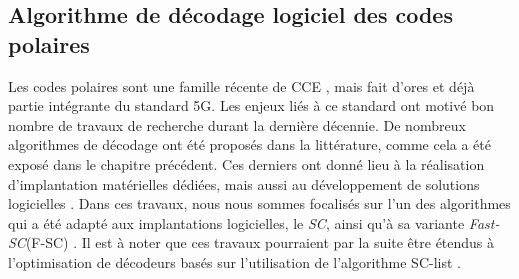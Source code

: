 \documentclass[../main.tex]{subfiles}
\begin{document}
\subsection{Algorithme de décodage logiciel des codes polaires}
%
%
%
%

Les codes polaires sont une famille récente de CCE \cite{Arikan_2009}, mais fait d'ores et déjà partie intégrante du standard 5G. Les enjeux liés à ce standard ont motivé bon nombre de travaux de recherche durant la dernière décennie. De nombreux algorithmes de décodage ont été proposés dans la littérature, comme cela a été exposé dans le chapitre précédent. Ces derniers ont donné lieu à la réalisation d'implantation matérielles dédiées, mais aussi au développement de solutions logicielles \cite{mcgill,Leonardon:2019vf}.
Dans ces travaux, nous nous sommes focalisés sur l'un des algorithmes qui a été adapté aux implantations logicielles, le \textit{SC}, ainsi qu'à sa variante \textit{Fast-SC}(F-SC) \cite{92}.
Il est à noter que ces travaux pourraient par la suite être étendus à l'optimisation de décodeurs basés sur l'utilisation de l'algorithme SC-list \cite{Leonardon:2019vf}.
\end{document}
